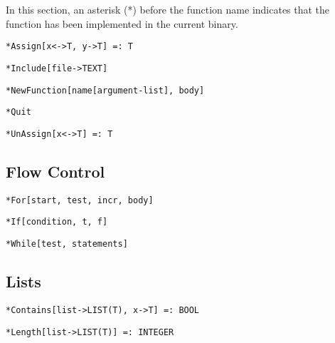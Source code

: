 \noindent In this section, an asterisk (*) before the function name indicates
that the function has been implemented in the current binary.

\protect \large \begin{verbatim}
*Assign[x<->T, y->T] =: T
\end{verbatim} \normalsize

\protect \large \begin{verbatim}
*Include[file->TEXT]
\end{verbatim}\normalsize

\protect \large \begin{verbatim}
*NewFunction[name[argument-list], body]
\end{verbatim}\normalsize

\protect \large \begin{verbatim}
*Quit
\end{verbatim}\normalsize

\protect \large \begin{verbatim}
*UnAssign[x<->T] =: T
\end{verbatim}\normalsize

\medskip
\subsection{Flow Control}

\protect \large \begin{verbatim}
*For[start, test, incr, body]
\end{verbatim}\normalsize


\protect \large \begin{verbatim}
*If[condition, t, f]
\end{verbatim} \normalsize


\protect \large \begin{verbatim}
*While[test, statements]
\end{verbatim} \normalsize


\medskip
\subsection{Lists}

\protect \large \begin{verbatim}
*Contains[list->LIST(T), x->T] =: BOOL
\end{verbatim}\normalsize

\protect \large \begin{verbatim}
*Length[list->LIST(T)] =: INTEGER
\end{verbatim}\normalsize

